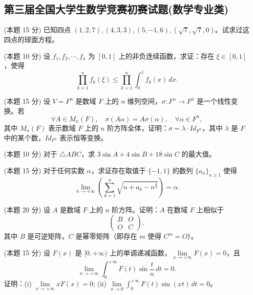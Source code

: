 \documentclass[loose]{ExBook}
\begin{document}
\subsection{第三届全国大学生数学竞赛初赛试题(数学专业类)}
\begin{qitems}
    \begin{bbox}
        \qitem (本题 15 分) 已知四点 $(1,2,7),(4,3,3),(5,-1,6), (\sqrt{7}, \sqrt{7}, 0)$。试求过这四点的球面方程。
    \end{bbox}

    \begin{bbox}
        \qitem (本题 10 分) 设 $f_1, f_2, \cdots, f_n$ 为 $[0,1]$ 上的非负连续函数，求证：存在 $\xi \in [0,1]$，使得
        \[
        \prod_{k=1}^{n} f_k(\xi) \leq \prod_{k=1}^{n} \int_{0}^{1} f_k(x) \, dx.
        \]
    \end{bbox}

    \begin{bbox}
        \qitem (本题 15 分) 设 $V = F^n$ 是数域 $F$ 上的 $n$ 维列空间，$\sigma : F^n \to F^n$ 是一个线性变换。若
        \[
        \forall A \in M_n(F), \quad \sigma(A\alpha) = A\sigma(\alpha), \quad \forall \alpha \in F^n,
        \]
        其中 $M_n(F)$ 表示数域 $F$ 上的 $n$ 阶方阵全体，证明：$\sigma = \lambda \cdot Id_{F^n}$，其中 $\lambda$ 是 $F$ 中的某个数，$Id_{F^n}$ 表示恒等变换。
    \end{bbox}

    \begin{bbox}
        \qitem (本题 10 分) 对于 $\triangle ABC$，求 $3\sin A + 4\sin B + 18\sin C$ 的最大值。
    \end{bbox}

    \begin{bbox}
        \qitem (本题 15 分) 对于任何实数 $\alpha$，求证存在取值于 $\{-1,1\}$ 的数列 $\{a_n\}_{n \geq 1}$ 使得
        \[
        \lim\limits_{n \to +\infty} \left( \sum_{k=1}^{n} \sqrt{n + a_k - n^{\frac{3}{2}}} \right) = \alpha.
        \]
    \end{bbox}

    \begin{bbox}
        \qitem (本题 20 分) 设 $A$ 是数域 $F$ 上的 $n$ 阶方阵。证明：$A$ 在数域 $F$ 上相似于
        \[
        \begin{pmatrix}
        B & O \\
        O & C 
        \end{pmatrix},
        \]
        其中 $B$ 是可逆矩阵，$C$ 是幂零矩阵（即存在 $m$ 使得 $C^m = O$）。
    \end{bbox}

    \begin{bbox}
        \qitem (本题 15 分) 设 $F(x)$ 是 $[0,+\infty)$ 上的单调递减函数，$\lim\limits_{x \to +\infty} F(x) = 0$，且
        \[
        \lim\limits_{n \to +\infty} \int_{0}^{+\infty} F(t) \sin \frac{t}{n} \, dt = 0.
        \]
        证明：(i) $\lim\limits_{x \to +\infty} xF(x) = 0$; (ii) $\lim\limits_{x \to 0} \int_{0}^{+\infty} F(t) \sin(xt) \, dt = 0$。
    \end{bbox}
\end{qitems}
\end{document}
